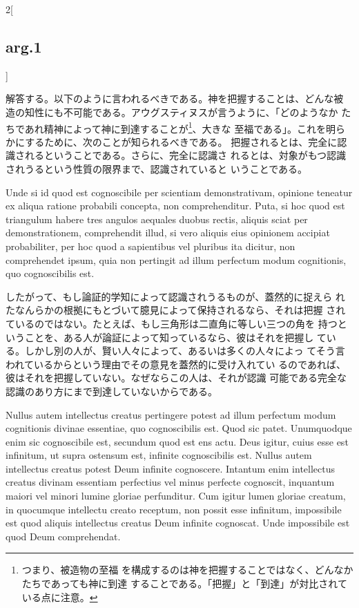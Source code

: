\documentclass[paper=a4paper,fontsize=10pt,jafontsize=9pt,titlepage]{jlreq}
\begin{document}
\begin{paracol}{2}[\subsection{arg.1}]
\switchcolumn

解答する。以下のように言われるべきである。神を把握することは、どんな被
造の知性にも不可能である。アウグスティヌスが言うように、「どのようなか
たちであれ精神によって神に到達することが\footnote{つまり、被造物の至福
を構成するのは神を把握することではなく、どんなかたちであっても神に到達
することである。「把握」と「到達」が対比されている点に注意。}、大きな
至福である」。これを明らかにするために、次のことが知られるべきである。
把握されるとは、完全に認識されるということである。さらに、完全に認識さ
れるとは、対象がもつ認識されうるという性質の限界まで、認識されていると
いうことである。

\switchcolumn*

Unde si id quod est cognoscibile per scientiam demonstrativam,
opinione teneatur ex aliqua ratione probabili concepta, non
comprehenditur. Puta, si hoc quod est triangulum habere tres angulos
aequales duobus rectis, aliquis sciat per demonstrationem,
comprehendit illud, si vero aliquis eius opinionem accipiat
probabiliter, per hoc quod a sapientibus vel pluribus ita dicitur, non
comprehendet ipsum, quia non pertingit ad illum perfectum modum
cognitionis, quo cognoscibilis est.

\switchcolumn

したがって、もし論証的学知によって認識されうるものが、蓋然的に捉えら
れたなんらかの根拠にもとづいて臆見によって保持されるなら、それは把握
されているのではない。たとえば、もし三角形は二直角に等しい三つの角を
持つということを、ある人が論証によって知っているなら、彼はそれを把握し
ている。しかし別の人が、賢い人々によって、あるいは多くの人々によっ
てそう言われているからという理由でその意見を蓋然的に受け入れてい
るのであれば、彼はそれを把握していない。なぜならこの人は、それが認識
可能である完全な認識のあり方にまで到達していないからである。

\switchcolumn*

Nullus autem intellectus creatus pertingere potest ad illum perfectum
modum cognitionis divinae essentiae, quo cognoscibilis est. Quod sic
patet. Unumquodque enim sic cognoscibile est, secundum quod est ens
actu. Deus igitur, cuius esse est infinitum, ut supra ostensum est,
infinite cognoscibilis est. Nullus autem intellectus creatus potest
Deum infinite cognoscere. Intantum enim intellectus creatus divinam
essentiam perfectius vel minus perfecte cognoscit, inquantum maiori
vel minori lumine gloriae perfunditur. Cum igitur lumen gloriae
creatum, in quocumque intellectu creato receptum, non possit esse
infinitum, impossibile est quod aliquis intellectus creatus Deum
infinite cognoscat. Unde impossibile est quod Deum comprehendat.


\end{paracol}
\end{document}
